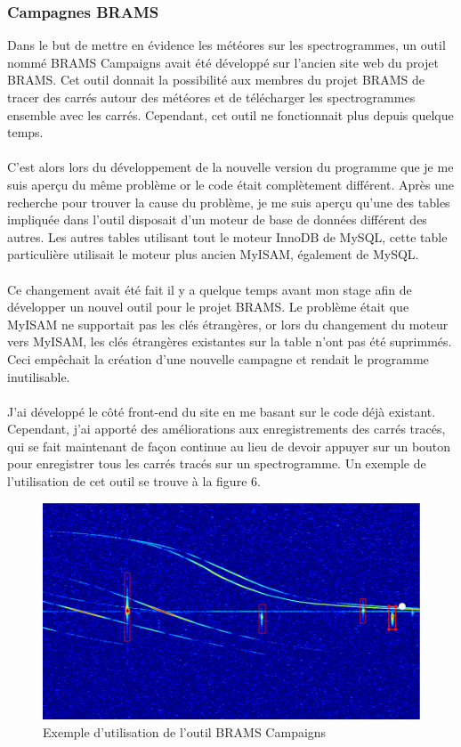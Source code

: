 \documentclass[11pt]{article}
\begin{document}
\subsubsection{Campagnes BRAMS}

Dans le but de mettre en évidence les météores sur les spectrogrammes, un outil nommé BRAMS Campaigns avait été développé sur l'ancien site web du projet BRAMS.
Cet outil donnait la possibilité aux membres du projet BRAMS de tracer des carrés autour des météores et de télécharger les spectrogrammes ensemble avec les carrés.
Cependant, cet outil ne fonctionnait plus depuis quelque temps.\\
\\
C'est alors lors du développement de la nouvelle version du programme que je me suis aperçu du même problème or le code était complètement différent.
Après une recherche pour trouver la cause du problème, je me suis aperçu qu'une des tables impliquée dans l'outil disposait d'un moteur de base de données différent des autres.
Les autres tables utilisant tout le moteur InnoDB de MySQL, cette table particulière utilisait le moteur plus ancien MyISAM, également de MySQL.\\
\\
Ce changement avait été fait il y a quelque temps avant mon stage afin de développer un nouvel outil pour le projet BRAMS.
Le problème était que MyISAM ne supportait pas les clés étrangères, or lors du changement du moteur vers MyISAM, les clés étrangères existantes sur la table n'ont pas été suprimmés.
Ceci empêchait la création d'une nouvelle campagne et rendait le programme inutilisable.\\
\\
J'ai développé le côté front-end du site en me basant sur le code déjà existant.
Cependant, j'ai apporté des améliorations aux enregistrements des carrés tracés, qui se fait maintenant de façon continue au lieu de devoir appuyer sur un bouton pour enregistrer tous les carrés tracés sur un spectrogramme.
Un exemple de l'utilisation de cet outil se trouve à la figure 6.

\begin{figure}[t]
    \begin{center}
        \includegraphics[scale=0.85]{campaigns.png}
        \caption{Exemple d'utilisation de l'outil BRAMS Campaigns}
    \end{center}
\end{figure}
\end{document}
